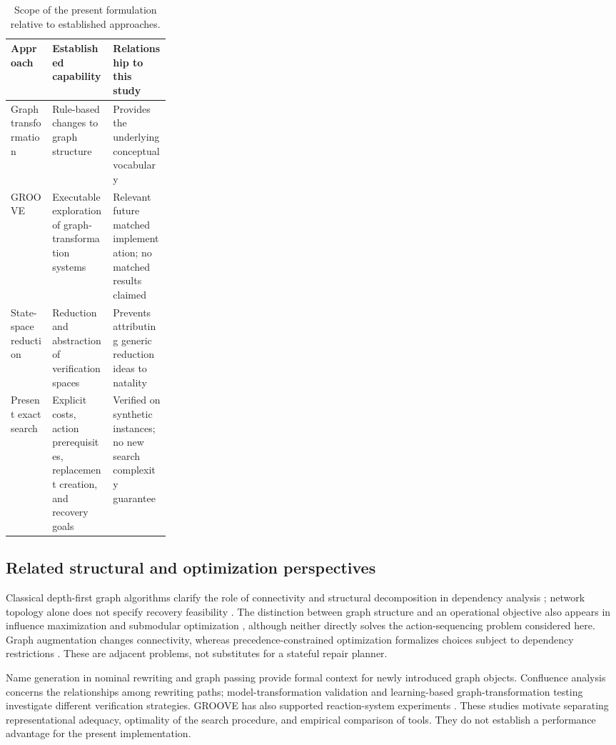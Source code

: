 \documentclass[11pt,a4paper]{article}
\begin{document}
\begin{table}[H]\centering\caption{Scope of the present formulation relative to established approaches.}\label{tab:prior}\small
\begin{tabularx}{\linewidth}{@{}p{0.26\linewidth}X X@{}}\toprule
Approach & Established capability & Relationship to this study\\\midrule
Graph transformation \cite{Ehrig2006,Konig2018} & Rule-based changes to graph structure & Provides the underlying conceptual vocabulary\\
GROOVE \cite{Ghamarian2012} & Executable exploration of graph-transformation systems & Relevant future matched implementation; no matched results claimed\\
State-space reduction \cite{Emerson2005,Konig2025} & Reduction and abstraction of verification spaces & Prevents attributing generic reduction ideas to natality\\
Present exact search & Explicit costs, action prerequisites, replacement creation, and recovery goals & Verified on synthetic instances; no new search complexity guarantee\\\bottomrule
\end{tabularx}\end{table}

\subsection{Related structural and optimization perspectives}
Classical depth-first graph algorithms clarify the role of connectivity and structural decomposition in dependency analysis \cite{Tarjan1972}; network topology alone does not specify recovery feasibility \cite{Newman2003}. The distinction between graph structure and an operational objective also appears in influence maximization \cite{Kempe2003} and submodular optimization \cite{Nemhauser1978}, although neither directly solves the action-sequencing problem considered here. Graph augmentation \cite{Eswaran1976} changes connectivity, whereas precedence-constrained optimization formalizes choices subject to dependency restrictions \cite{Boyd1993,You2007,Espinoza2015}. These are adjacent problems, not substitutes for a stateful repair planner.

Name generation in nominal rewriting \cite{Fernandez2005} and graph passing \cite{GhamarianGraphPassing2012} provide formal context for newly introduced graph objects. Confluence analysis \cite{Campbell2021} concerns the relationships among rewriting paths; model-transformation validation \cite{Adam2026} and learning-based graph-transformation testing \cite{Ghasemi2026} investigate different verification strategies. GROOVE has also supported reaction-system experiments \cite{Bruni2025}. These studies motivate separating representational adequacy, optimality of the search procedure, and empirical comparison of tools. They do not establish a performance advantage for the present implementation.
\end{document}
